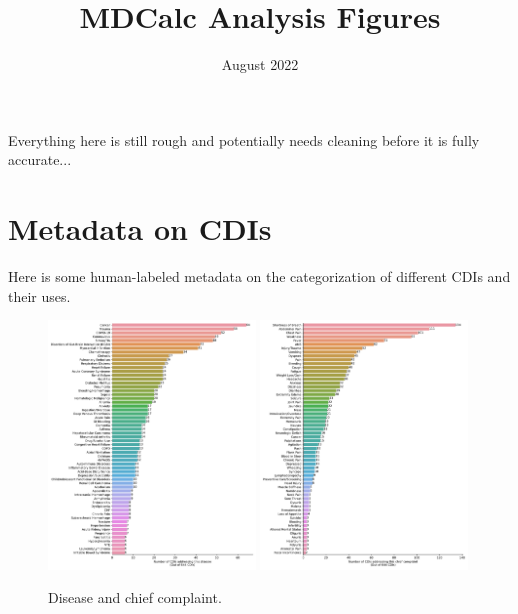 \documentclass[10pt]{article}
\title{MDCalc Analysis Figures}
\author{}
\date{August 2022}
\begin{document}
\maketitle

Everything here is still rough and potentially needs cleaning before it is fully accurate...

\section{Metadata on CDIs}

Here is some human-labeled metadata on the categorization of different CDIs and their uses. 

\begin{figure}[H]
    \centering
    \includegraphics[width=0.49\textwidth]{../results/disease_en.pdf}
    \includegraphics[width=0.49\textwidth]{../results/chief_complaint_en.pdf}
    \caption{Disease and chief complaint.}
\end{figure}
\end{document}
